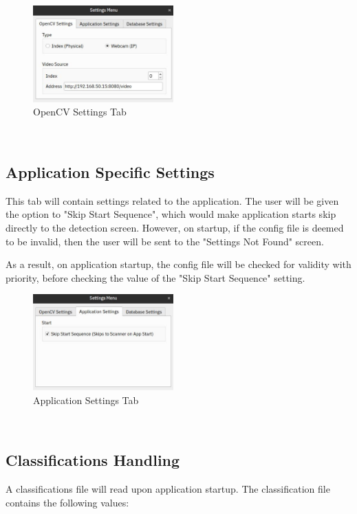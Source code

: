 \documentclass[conference]{IEEEtran}
\begin{document}
\begin{figure}[h]
    \centering
    \includegraphics[width=0.48\textwidth]{images/opencv_settings.eps}
    \caption{OpenCV Settings Tab}
\end{figure}~\\

\subsection{Application Specific Settings}
This tab will contain settings related to the application. The user will be given the option to "Skip Start Sequence", which would make application starts skip directly to the detection screen. However, on startup, if the config file is deemed to be invalid, then the user will be sent to the "Settings Not Found" screen. 

As a result, on application startup, the config file will be checked for validity with priority, before checking the value of the "Skip Start Sequence" setting.~\\

\begin{figure}[h]
    \centering
    \includegraphics[width=0.48\textwidth]{images/app_settings.eps}
    \caption{Application Settings Tab}
\end{figure}~\\

\subsection{Classifications Handling}
A classifications file will read upon application startup. The classification file contains the following values:
\end{document}
